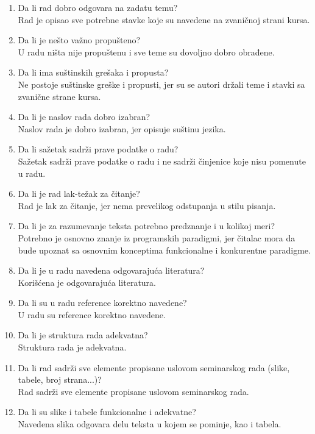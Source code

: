 \documentclass[a4paper]{report}
\begin{document}
\begin{enumerate}
\item Da li rad dobro odgovara na zadatu temu?\\
Rad je opisao sve potrebne stavke koje su navedene na zvaničnoj strani kursa.
\item Da li je nešto važno propušteno?\\
U radu ništa nije propuštenu i sve teme su dovoljno dobro obrađene.
\item Da li ima suštinskih grešaka i propusta?\\
Ne postoje suštinske greške i propusti, jer su se autori držali teme i stavki sa zvanične strane kursa.
\item Da li je naslov rada dobro izabran?\\
Naslov rada je dobro izabran, jer opisuje suštinu jezika.
\item Da li sažetak sadrži prave podatke o radu?\\
Sažetak sadrži prave podatke o radu i ne sadrži činjenice koje nisu pomenute u radu.
\item Da li je rad lak-težak za čitanje?\\
Rad je lak za čitanje, jer nema prevelikog odstupanja u stilu pisanja.
\item Da li je za razumevanje teksta potrebno predznanje i u kolikoj meri?\\
Potrebno je osnovno znanje iz programskih paradigmi, jer čitalac mora da bude upoznat sa osnovnim konceptima funkcionalne i konkurentne paradigme. 
\item Da li je u radu navedena odgovarajuća literatura?\\
Korišćena je odgovarajuća literatura.
\item Da li su u radu reference korektno navedene?\\
U radu su reference korektno navedene.
\item Da li je struktura rada adekvatna?\\
Struktura rada je adekvatna.
\item Da li rad sadrži sve elemente propisane uslovom seminarskog rada (slike, tabele, broj strana...)?\\
Rad sadrži sve elemente propisane uslovom seminarskog rada.
\item Da li su slike i tabele funkcionalne i adekvatne?\\
Navedena slika odgovara delu teksta u kojem se pominje, kao i tabela. 
\end{enumerate}
\end{document}
